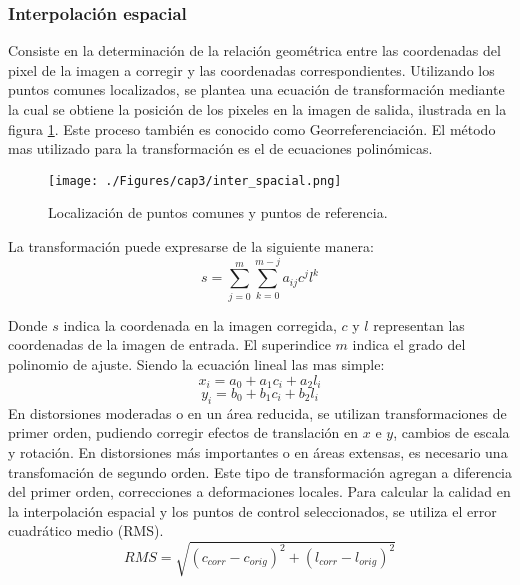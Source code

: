 \subsubsection{Interpolaci\'on espacial}
Consiste en la determinaci\'on de la relaci\'on geom\'etrica entre las coordenadas del pixel de la imagen a corregir y las coordenadas correspondientes. Utilizando los puntos comunes localizados, se plantea una ecuaci\'on de transformaci\'on mediante la cual se obtiene la posici\'on de los pixeles en la imagen de salida, ilustrada en la figura \ref{fig:intEspacial}. Este proceso tambi\'en es conocido como Georreferenciaci\'on. El m\'etodo mas utilizado para la transformaci\'on es el de ecuaciones polin\'omicas. 
    \begin{figure}[H]
    	\centering
    	\texttt{[image: ./Figures/cap3/inter\_spacial.png]}
    	\caption{Localizaci\'on de puntos comunes y puntos de referencia.}
    	\label{fig:intEspacial}
    \end{figure}
 
 La transformaci\'on puede expresarse de la siguiente manera:
	\begin{equation}
	s = \sum_{j=0}^{m} \sum_{k=0}^{m-j} a_{ij}c^{j}l^{k}
	\end{equation} 

Donde $ s $ indica la coordenada en la imagen corregida, $ c $ y $ l $ representan las coordenadas de la imagen de entrada. El superindice $ m $ indica el grado del polinomio de ajuste. Siendo la ecuaci\'on lineal las mas simple:
	\begin{equation}
	x_{i} = a_{0}+a_{1}c_{i}+a_{2}l_{i}
	\end{equation} 
		\begin{equation}
		y_{i} = b_{0}+b_{1}c_{i}+b_{2}l_{i}
		\end{equation} 
En distorsiones moderadas o en un \'area reducida, se utilizan transformaciones de primer orden, pudiendo corregir efectos de translaci\'on en $ x $ e $ y $, cambios de escala y rotaci\'on.
En distorsiones m\'as importantes o en \'areas extensas, es necesario una transfomaci\'on de segundo orden. Este tipo de transformaci\'on agregan a diferencia del primer orden, correcciones a deformaciones locales.
Para calcular la calidad en la interpolaci\'on espacial y los puntos de control seleccionados, se utiliza el error cuadrático medio (RMS).
		\begin{equation}
		RMS = \sqrt{(c_{corr}-c_{orig})^{2}+(l_{corr}-l_{orig})^{2}}
		\end{equation} 

